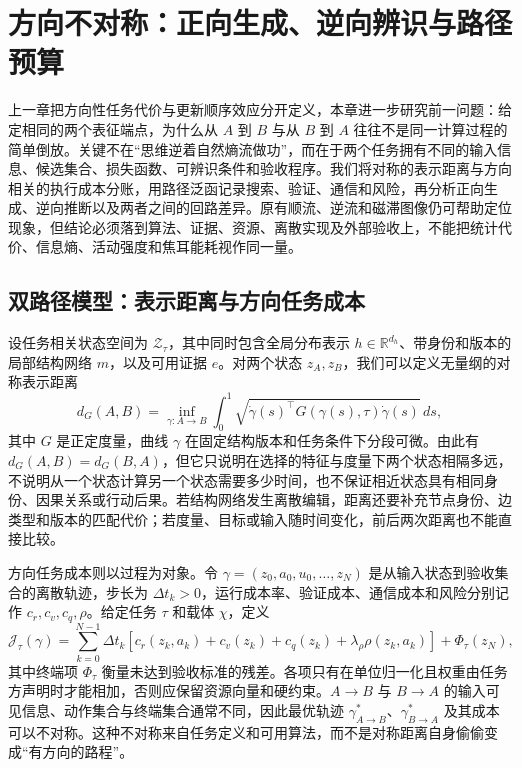 \chapter{方向不对称：正向生成、逆向辨识与路径预算}
\label{chap:path_integration_asymmetry}

上一章把方向性任务代价与更新顺序效应分开定义，本章进一步研究前一问题：给定相同的两个表征端点，为什么从 $A$ 到 $B$ 与从 $B$ 到 $A$ 往往不是同一计算过程的简单倒放。关键不在“思维逆着自然熵流做功”，而在于两个任务拥有不同的输入信息、候选集合、损失函数、可辨识条件和验收程序。我们将对称的表示距离与方向相关的执行成本分账，用路径泛函记录搜索、验证、通信和风险，再分析正向生成、逆向推断以及两者之间的回路差异。原有顺流、逆流和磁滞图像仍可帮助定位现象，但结论必须落到算法、证据、资源、离散实现及外部验收上，不能把统计代价、信息熵、活动强度和焦耳能耗视作同一量。

\section{双路径模型：表示距离与方向任务成本}
\label{sec:dual_path_model}

设任务相关状态空间为 $\mathcal Z_\tau$，其中同时包含全局分布表示 $h\in\mathbb R^{d_h}$、带身份和版本的局部结构网络 $m$，以及可用证据 $e$。对两个状态 $z_A,z_B$，我们可以定义无量纲的对称表示距离
\[
d_G(A,B)=\inf_{\gamma:A\to B}\int_0^1
\sqrt{\dot\gamma(s)^\top G(\gamma(s),\tau)\dot\gamma(s)}\,ds,
\]
其中 $G$ 是正定度量，曲线 $\gamma$ 在固定结构版本和任务条件下分段可微。由此有 $d_G(A,B)=d_G(B,A)$，但它只说明在选择的特征与度量下两个状态相隔多远，不说明从一个状态计算另一个状态需要多少时间，也不保证相近状态具有相同身份、因果关系或行动后果。若结构网络发生离散编辑，距离还要补充节点身份、边类型和版本的匹配代价；若度量、目标或输入随时间变化，前后两次距离也不能直接比较。

方向任务成本则以过程为对象。令 $\gamma=(z_0,a_0,u_0,\ldots,z_N)$ 是从输入状态到验收集合的离散轨迹，步长为 $\Delta t_k>0$，运行成本率、验证成本、通信成本和风险分别记作 $c_r,c_v,c_q,\rho$。给定任务 $\tau$ 和载体 $\chi$，定义
\[
\mathcal J_\tau(\gamma)=\sum_{k=0}^{N-1}\Delta t_k
[c_r(z_k,a_k)+c_v(z_k)+c_q(z_k)+\lambda_\rho\rho(z_k,a_k)]
+\Phi_\tau(z_N),
\]
其中终端项 $\Phi_\tau$ 衡量未达到验收标准的残差。各项只有在单位归一化且权重由任务方声明时才能相加，否则应保留资源向量和硬约束。$A\to B$ 与 $B\to A$ 的输入可见信息、动作集合与终端集合通常不同，因此最优轨迹 $\gamma^*_{A\to B}$、$\gamma^*_{B\to A}$ 及其成本可以不对称。这种不对称来自任务定义和可用算法，而不是对称距离自身偷偷变成“有方向的路程”。

